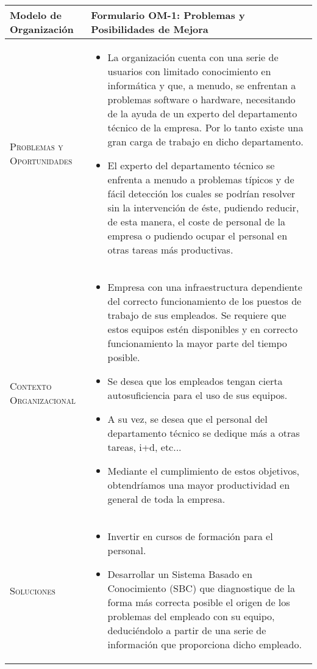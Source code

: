 \documentclass[12pt,a4paper,twoside,spanish]{article}      %
\begin{document}
\begin{table}[H]
\scriptsize
\begin{tabularx}{\textwidth}{|l|X|} \hline
\textbf{Modelo de Organización} & \textbf{Formulario OM-1: Problemas y Posibilidades de Mejora} \\ \hline\hline

\textsc{Problemas y Oportunidades} & 
\begin{itemize}
	\item La organización cuenta con una serie de usuarios con limitado conocimiento en informática y que, a menudo, se enfrentan a problemas software o hardware, necesitando de la ayuda de un experto del departamento técnico de la empresa. Por lo tanto existe una gran carga de trabajo en dicho departamento.
	\item El experto del departamento técnico se enfrenta a menudo a problemas típicos y de fácil detección los cuales se podrían resolver sin la intervención de éste, pudiendo reducir, de esta manera, el coste de personal de la empresa o pudiendo ocupar el personal en otras tareas más productivas.
\end{itemize}
  \\ \hline
\textsc{Contexto Organizacional} &

\begin{itemize}
	\item Empresa con una infraestructura dependiente del correcto funcionamiento de los puestos de trabajo de sus empleados. Se requiere que estos equipos estén disponibles y en correcto funcionamiento la mayor parte del tiempo posible. 
	\item Se desea que los empleados tengan cierta autosuficiencia para el uso de sus equipos.
	\item A su vez, se desea que el personal del departamento técnico se dedique más a otras tareas, i+d, etc...
	\item Mediante el cumplimiento de estos objetivos, obtendríamos una mayor productividad en general de toda la empresa.
\end{itemize}

 \\ \hline
\textsc{Soluciones} &
\begin{itemize}
	\item Invertir en cursos de formación para el personal.
	\item Desarrollar un Sistema Basado en Conocimiento (SBC) que diagnostique de la forma más correcta posible el origen de los problemas del empleado con su equipo, deduciéndolo a partir de una serie de información que proporciona dicho empleado. 
\end{itemize}

\\
\hline
\end{tabularx}
  \label{tab.OM1}
\end{table}
\end{document}
